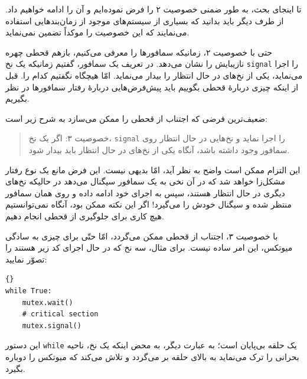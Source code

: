 \documentclass{book}
\begin{document}
    تا  اینجای بحث، به طور ضمنی خصوصیت ۲ را فرض نموده‌ایم و آن را ادامه خواهیم داد. 
    از طرف دیگر باید بدانید که بسیاری از سیستم‌های موجود از زمان‌بندهایی استفاده می‌نمایند که این خصوصیت را موکداً تضمین نمی‌نماید. 

    حتی با خصوصیت ۲، زمانیکه سمافورها را معرفی می‌کنیم، بازهم قحطی چهره نازیبایش را نشان می‌دهد. 
    در تعریف یک سمافور، گفتیم زمانیکه یک نخ {\tt signal} را اجرا می‌نماید، یکی از نخ‌های در حال انتظار را بیدار می‌نماید. امّا هیچگاه نگفتیم کدام را. 
    قبل از اینکه چیزی دربارهٔ قحطی بگوییم باید پیش‌فرض‌هایی دربارهٔ رفتار سمافورها در نظر بگیریم. 

    ضعیف‌ترین فرضی که اجتناب از قحطی را ممکن می‌سازد به شرح زیر است:

\begin{quote}
    خصوصیت ۳: اگر یک نخ، {\tt signal} را اجرا نماید و نخ‌هایی در حال انتظار روی سمافور وجود داشته باشد،
    آنگاه یکی از نخ‌های در حال انتظار باید بیدار شود. 
\end{quote}

    این التزام ممکن است واضح به نظر آید، امّا بدیهی نیست. این فرض مانع یک نوع رفتار مشکل‌زا خواهد شد که در آن 
    نخی به یک سمافور سیگنال می‌دهد در حالیکه نخ‌های دیگری در حال انتظار هستند، سپس به اجرای خود ادامه داده و روی همان سمافور منتظر شده و 
    سیگنال خودش را می‌گیرد! 
    اگر این نکته ممکن بود،   آنگاه نمی‌توانستیم هیچ کاری برای جلوگیری از قحطی انجام دهیم. 

    با خصوصیت ۳، اجتناب از قحطی ممکن می‌گردد، امّا حتّی برای چیزی به سادگی میوتکس، این امر ساده نیست. 
    برای مثال، سه نخ که در حال اجرای کد زیر هستند را تصوّر نمایید:
    
\begin{latin}
\begin{lstlisting}[title=\rl{حلقه میوتکس}]{}
while True:
    mutex.wait()
    # critical section 
    mutex.signal()
\end{lstlisting}
\end{latin}

    این دستور {\tt while} یک حلقه بی‌پایان است؛ به عبارت دیگر، به محض اینکه یک نخ، ناحیه بحرانی را ترک می‌نماید به بالای حلقه بر می‌گردد و 
    تلاش می‌کند که میوتکس را دوباره بگیرد. 
\end{document}

